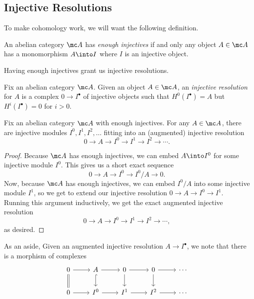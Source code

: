 \documentclass[../notes.tex]{subfiles}
\begin{document}
\subsection{Injective Resolutions}
To make cohomology work, we will want the following definition.
\begin{definition}
	An abelian category $\mc A$ has \textit{enough injectives} if and only any object $A\in\mc A$ has a monomorphism $A\into I$ where $I$ is an injective object.
\end{definition}
Having enough injectives grant us injective resolutions.
\begin{definition}
	Fix an abelian category $\mc A$. Given an object $A\in\mc A$, an \textit{injective resolution} for $A$ is a complex $0\to I^\bullet$ of injective objects such that $H^0(I^\bullet)=A$ but $H^i(I^\bullet)=0$ for $i>0$.
\end{definition}
\begin{proposition}
	Fix an abelian category $\mc A$ with enough injectives. For any $A\in\mc A$, there are injective modules $I^0,I^1,I^2,\ldots$ fitting into an (augmented) injective resolution
	\[0\to A\to I^0\to I^1\to I^2\to\cdots.\]
\end{proposition}
\begin{proof}
	Because $\mc A$ has enough injectives, we can embed $A\into I^0$ for some injective module $I^0$. This gives us a short exact sequence
	\[0\to A\to I^0\to I^0/A\to0.\]
	Now, because $\mc A$ has enough injectives, we can embed $I^0/A$ into some injective module $I^1$, so we get to extend our injective resolution $0\to A\to I^0\to I^1$. Running this argument inductively, we get the exact augmented injective resolution
	\[0\to A\to I^0\to I^1\to I^2\to\cdots,\]
	as desired.
\end{proof}
As an aside, Given an augmented injective resolution $A\to I^\bullet$, we note that there is a morphism of complexes
\[\begin{tikzcd}
	0 & A & 0 & 0 & \cdots \\
	0 & {I^0} & {I^1} & {I^2} & \cdots
	\arrow[from=1-1, to=1-2]
	\arrow[from=1-2, to=1-3]
	\arrow[from=1-3, to=1-4]
	\arrow[from=1-4, to=1-5]
	\arrow[from=2-1, to=2-2]
	\arrow[from=2-2, to=2-3]
	\arrow[from=2-3, to=2-4]
	\arrow[from=2-4, to=2-5]
	\arrow[Rightarrow, no head, from=1-1, to=2-1]
	\arrow[hook, from=1-2, to=2-2]
	\arrow[from=1-3, to=2-3]
	\arrow[from=1-4, to=2-4]
\end{tikzcd}\]
\end{document}

